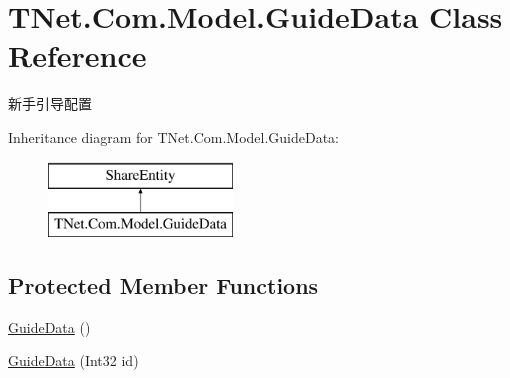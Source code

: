 \hypertarget{class_t_net_1_1_com_1_1_model_1_1_guide_data}{}\section{T\+Net.\+Com.\+Model.\+Guide\+Data Class Reference}
\label{class_t_net_1_1_com_1_1_model_1_1_guide_data}


新手引导配置  


Inheritance diagram for T\+Net.\+Com.\+Model.\+Guide\+Data\+:\begin{figure}[H]
\begin{center}
\leavevmode
\includegraphics[height=2.000000cm]{class_t_net_1_1_com_1_1_model_1_1_guide_data}
\end{center}
\end{figure}
\subsection*{Protected Member Functions}
\begin{DoxyCompactItemize}
\item 
\mbox{\hyperlink{class_t_net_1_1_com_1_1_model_1_1_guide_data_a9f8c27aa972dc1618b44e317128ac60b}{Guide\+Data}} ()
\item 
\mbox{\hyperlink{class_t_net_1_1_com_1_1_model_1_1_guide_data_aa22d87c3d7326db7220e013fc32686d0}{Guide\+Data}} (Int32 id)
\end{DoxyCompactItemize}
